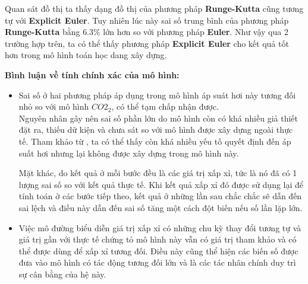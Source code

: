 \documentclass[a4paper]{article}
\begin{document}
Quan sát đồ thị ta thấy dạng đồ thị của phương pháp \textbf{Runge-Kutta} cũng tương tự với \textbf{Explicit Euler}. Tuy nhiên lúc này sai số trung bình của phương pháp \textbf{Runge-Kutta} bằng $6.3\%$ lớn hơn so với phương pháp \textbf{Euler}. Như vậy qua 2 trường hợp trên, ta có thể thấy phương pháp \textbf{Explicit Euler} cho kết quả tốt hơn trong mô hình toán học dang xây dựng.\par

\textbf{Bình luận về tính chính xác của mô hình:} \par
\begin{itemize}
    \item Sai số ở hai phương pháp áp dụng trong mô hình áp suát hơi này tương đối nhỏ so với mô hình $CO2_2$, có thể tạm chấp nhận được. \\
    Nguyên nhân gây nên sai số phần lớn do mô hình còn có khá nhiều giả thiết đặt ra, thiếu dữ kiện và chưa sát so với mô hình được xây dựng ngoài thực tế. Tham khảo từ \cite{vanthoor2011model}, ta có thể thấy còn khá nhiều yếu tố quyết định đến áp suất hơi nhưng lại không được xây dựng trong mô hình này.\par
    Mặt khác, do kết quả ở mỗi bước đều là các giá trị xấp xỉ, tức là nó đã có 1 lượng sai số so với kết quả thực tế. Khi kết quả xấp xỉ đó được sử dụng lại để tính toán ở các bước tiếp theo, kết quả ở những lần sau chắc chắc sẽ dẫn đến sai lệch và điều này dẫn đến sai số tăng một cách đột biến nếu số lần lặp lớn.
    \item Việc mô đường biểu diễn giá trị xấp xỉ có những chu kỳ thay đổi tương tự và giá trị gần với thực tế chứng tỏ mô hình này vẫn có giá trị tham khảo và có thể được dùng để xấp xỉ tương đối. Điều này cũng thể hiện các biến số được đưa vào mô hình có tác động tương đối lớn và là các tác nhân chính duy trì sự cân bằng của hệ này.
\end{itemize}
\end{document}

